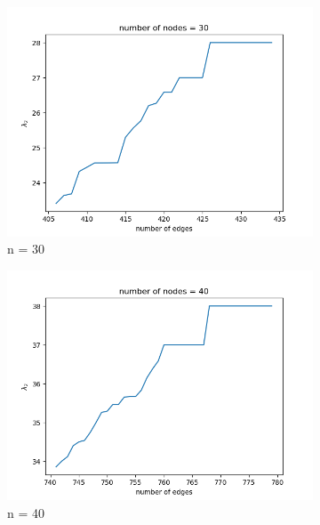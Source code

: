 \documentclass{article}
\begin{document}
\begin{problem}
\begin{figure}[!ht]
    \begin{subfigure}{0.35\textwidth}
        \includegraphics[width=\textwidth]{./img/p5_node30.png}
        \caption{n = 30}
    \end{subfigure}
    \begin{subfigure}{0.35\textwidth}
        \includegraphics[width=\textwidth]{./img/p5_node40.png}
        \caption{n = 40 }
    \end{subfigure}
    \begin{subfigure}{0.35\textwidth}

\end{subfigure}
\end{figure}
\end{problem}
\end{document}
